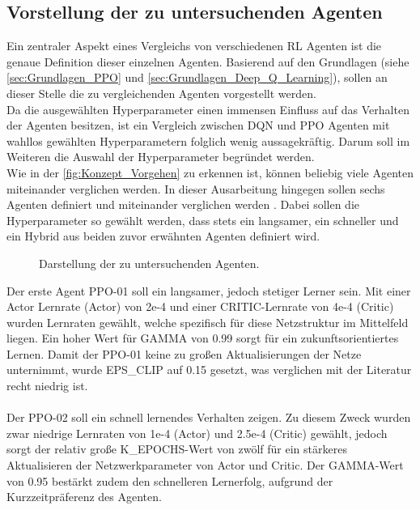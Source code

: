 \subsection{Vorstellung der zu untersuchenden Agenten} \label{subsec:Konzept_Vorstellung_Agenten}
Ein zentraler Aspekt eines Vergleichs von verschiedenen RL Agenten ist die genaue Definition dieser einzelnen Agenten. 
Basierend auf den Grundlagen (siehe \autoref{sec:Grundlagen_PPO} und \autoref{sec:Grundlagen_Deep_Q_Learning}), sollen an dieser Stelle die zu vergleichenden Agenten vorgestellt werden.\\
Da die ausgewählten Hyperparameter einen immensen Einfluss auf das Verhalten der Agenten besitzen, ist ein Vergleich zwischen DQN und PPO Agenten mit wahllos gewählten Hyperparametern folglich wenig aussagekräftig. Darum soll im Weiteren die Auswahl der Hyperparameter begründet werden.\\
Wie in der \autoref{fig:Konzept_Vorgehen} zu erkennen ist, können beliebig viele Agenten miteinander verglichen werden. In dieser Ausarbeitung hingegen sollen sechs Agenten definiert und miteinander verglichen werden . Dabei sollen die Hyperparameter so gewählt werden, dass stets ein langsamer, ein schneller und ein Hybrid aus beiden zuvor erwähnten Agenten definiert wird.
\begin{figure}[H]
	\centering
	
	\caption[Agenten]{Darstellung der zu untersuchenden Agenten.}
	\label{fig:Konzept_Agenten}
\end{figure}
Der erste Agent PPO-01 soll ein langsamer, jedoch stetiger Lerner sein. Mit einer Actor Lernrate (Actor) von 2e-4 und einer CRITIC-Lernrate von 4e-4 (Critic) wurden Lernraten gewählt, welche spezifisch für diese Netzstruktur im Mittelfeld liegen. Ein hoher Wert für GAMMA von 0.99 sorgt für ein zukunftsorientiertes Lernen. Damit der PPO-01 keine zu großen Aktualisierungen der Netze unternimmt, wurde EPS\_CLIP auf 0.15 gesetzt, was verglichen mit der Literatur \cite[S. 6]{PPO} recht niedrig ist.\\
\\Der PPO-02 soll ein schnell lernendes Verhalten zeigen. Zu diesem Zweck wurden zwar niedrige Lernraten von 1e-4 (Actor) und 2.5e-4 (Critic) gewählt, jedoch sorgt der relativ große K\_EPOCHS-Wert von zwölf für ein stärkeres Aktualisieren der Netzwerkparameter von Actor und Critic. Der GAMMA-Wert von 0.95 bestärkt zudem den schnelleren Lernerfolg, aufgrund der Kurzzeitpräferenz des Agenten.\\
